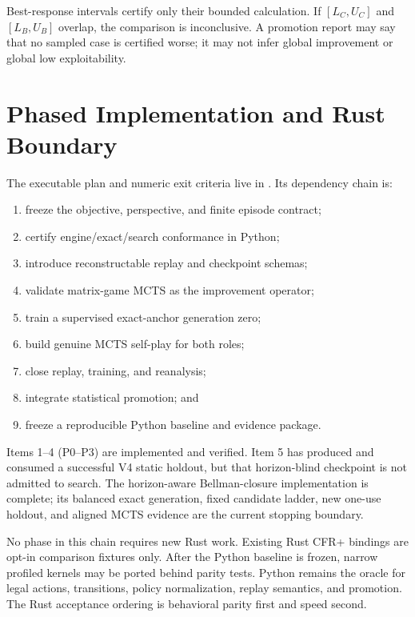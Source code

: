 \documentclass[11pt]{article}
\begin{document}
Best-response intervals certify only their bounded calculation. If
\([L_C,U_C]\) and \([L_B,U_B]\) overlap, the comparison is inconclusive. A
promotion report may say that no sampled case is certified worse; it may not
infer global improvement or global low exploitability.

\section{Phased Implementation and Rust Boundary}

The executable plan and numeric exit criteria live in
. Its dependency chain is:

\begin{enumerate}[leftmargin=*]
  \item freeze the objective, perspective, and finite episode contract;
  \item certify engine/exact/search conformance in Python;
  \item introduce reconstructable replay and checkpoint schemas;
  \item validate matrix-game MCTS as the improvement operator;
  \item train a supervised exact-anchor generation zero;
  \item build genuine MCTS self-play for both roles;
  \item close replay, training, and reanalysis;
  \item integrate statistical promotion; and
  \item freeze a reproducible Python baseline and evidence package.
\end{enumerate}

Items 1--4 (P0--P3) are implemented and verified. Item 5 has produced and
consumed a successful V4 static holdout, but that horizon-blind checkpoint is
not admitted to search. The horizon-aware Bellman-closure implementation is
complete; its balanced exact generation, fixed candidate ladder, new one-use
holdout, and aligned MCTS evidence are the current stopping boundary.

No phase in this chain requires new Rust work. Existing Rust CFR+ bindings are
opt-in comparison fixtures only. After the Python baseline is frozen, narrow
profiled kernels may be ported behind parity tests. Python remains the oracle
for legal actions, transitions, policy normalization, replay semantics, and
promotion. The Rust acceptance ordering is behavioral parity first and speed
second.
\end{document}
